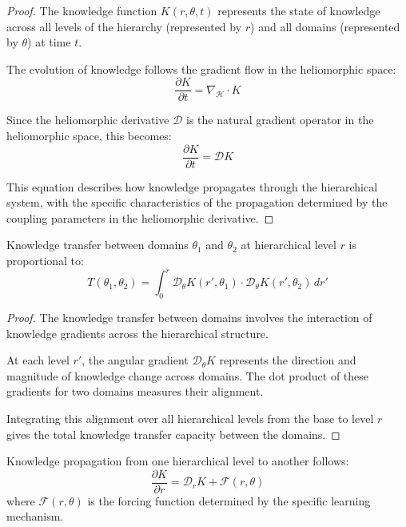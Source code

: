 \begin{proof}
The knowledge function $K(r,\theta,t)$ represents the state of knowledge across all levels of the hierarchy (represented by $r$) and all domains (represented by $\theta$) at time $t$.

The evolution of knowledge follows the gradient flow in the heliomorphic space:
\begin{equation}
\frac{\partial K}{\partial t} = \nabla_{\mathcal{H}} \cdot K
\end{equation}

Since the heliomorphic derivative $\mathcal{D}$ is the natural gradient operator in the heliomorphic space, this becomes:
\begin{equation}
\frac{\partial K}{\partial t} = \mathcal{D}K
\end{equation}

This equation describes how knowledge propagates through the hierarchical system, with the specific characteristics of the propagation determined by the coupling parameters in the heliomorphic derivative.
\end{proof}

\begin{theorem}
Knowledge transfer between domains $\theta_1$ and $\theta_2$ at hierarchical level $r$ is proportional to:
\begin{equation}
T(\theta_1, \theta_2) = \int_0^r \mathcal{D}_\theta K(r',\theta_1) \cdot \mathcal{D}_\theta K(r',\theta_2) \, dr'
\end{equation}
\end{theorem}

\begin{proof}
The knowledge transfer between domains involves the interaction of knowledge gradients across the hierarchical structure.

At each level $r'$, the angular gradient $\mathcal{D}_\theta K$ represents the direction and magnitude of knowledge change across domains. The dot product of these gradients for two domains measures their alignment.

Integrating this alignment over all hierarchical levels from the base to level $r$ gives the total knowledge transfer capacity between the domains.
\end{proof}

\begin{theorem}
Knowledge propagation from one hierarchical level to another follows:
\begin{equation}
\frac{\partial K}{\partial r} = \mathcal{D}_r K + \mathcal{F}(r,\theta)
\end{equation}
where $\mathcal{F}(r,\theta)$ is the forcing function determined by the specific learning mechanism.
\end{theorem}

